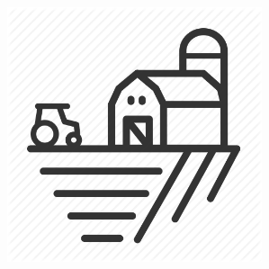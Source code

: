 \documentclass{article}
\begin{document}
\begin{center}
    \includegraphics[width=75mm]{screens/field.jpg}
\end{center}

\newcommand{\AASprTab}[5]{


\begin{center}
\begin{tabular}{ p{0.06\textwidth} p{0.2\textwidth} p{0.2\textwidth} p{0.2\textwidth} p{0.2\textwidth} p{0.2\textwidth} }

  &   &   &   &   \\
\hline
\multicolumn{6}{|c|}{}\\[-1ex]
\multicolumn{6}{|c|}{{\LARGE Optymalizacja niewielkiego gospodarstwa rolnego}} \\
\multicolumn{6}{|c|}{}\\[-1ex]



\hline
\multicolumn{2}{|l|}{\AASprTabFieldDsc{Wydział}} & \multicolumn{2}{|l|}{\AASprTabFieldDsc{Kierunek}} & \multicolumn{2}{|l|}{\AASprTabFieldDsc{Rok}} \\
\multicolumn{2}{|c|}{\AASprTabFieldVar{EAIiIB}} & \multicolumn{2}{|c|}{\AASprTabFieldVar{Automatyka i Robotyka}} & \multicolumn{2}{|c|}{\AASprTabFieldVar{III}} \\



\hline
\multicolumn{1}{|c|}{\tiny{ }} &
\multicolumn{5}{|c|}{\tiny{ }} \\
\multicolumn{1}{|c|}{\AASprTabFieldDscH{L.p.}} &
\multicolumn{5}{|l|}{\AASprTabFieldDscH{Skład grupy ćwiczeniowej}}\\

\hline
\multicolumn{1}{|c|}{1} &
\multicolumn{5}{|l|}{\AASprTabFieldVar{#3}}\\

\hline
\multicolumn{1}{|c|}{2} &
\multicolumn{5}{|l|}{\AASprTabFieldVar{#4}}\\

\hline
\multicolumn{1}{|c|}{3} &
\multicolumn{5}{|l|}{\AASprTabFieldVar{#5}}\\

\hline
\end{tabular}
\end{center}
}
\end{document}
